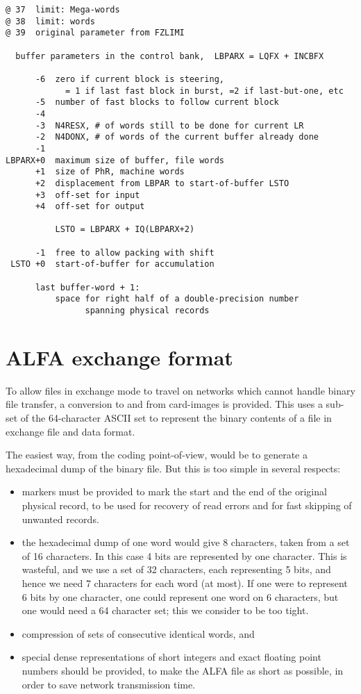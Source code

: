 \begin{verbatim}
@ 37  limit: Mega-words
@ 38  limit: words
@ 39  original parameter from FZLIMI

  buffer parameters in the control bank,  LBPARX = LQFX + INCBFX

      -6  zero if current block is steering,
            = 1 if last fast block in burst, =2 if last-but-one, etc
      -5  number of fast blocks to follow current block
      -4
      -3  N4RESX, # of words still to be done for current LR
      -2  N4DONX, # of words of the current buffer already done
      -1
LBPARX+0  maximum size of buffer, file words
      +1  size of PhR, machine words
      +2  displacement from LBPAR to start-of-buffer LSTO
      +3  off-set for input
      +4  off-set for output

          LSTO = LBPARX + IQ(LBPARX+2)

      -1  free to allow packing with shift
 LSTO +0  start-of-buffer for accumulation

      last buffer-word + 1:
          space for right half of a double-precision number
                spanning physical records
\end{verbatim}

\section{ALFA exchange format}

To allow files in exchange mode to travel on networks which
cannot handle binary file transfer, a conversion to and from
card-images is provided.
This uses a sub-set of the 64-character ASCII set
to represent the binary contents of a file
in exchange file and data format.

The easiest way, from the coding point-of-view,
would be to generate a hexadecimal dump of the binary file.
But this is too simple in several respects:

\begin{itemize}
\item markers must be provided to mark the start and the end of the
      original physical record, to be used for recovery of read errors
      and for fast skipping of unwanted records.
\item the hexadecimal dump of one word would give 8 characters,
      taken from a set of 16 characters.
      In this case 4 bits are represented by one character.
      This is wasteful,
      and we use a set of 32 characters,
      each representing 5 bits, and hence we need 7 characters
      for each word (at most).
      If one were to represent 6 bits by one character,
      one could represent one word on 6 characters,
      but one would need a 64 character set;
      this we consider to be too tight.
\item compression of sets of consecutive identical words, and
\item special dense representations of short integers and exact
      floating point numbers should be provided, to make the ALFA file
      as short as possible,
       in order to save network transmission time.
\end{itemize}

